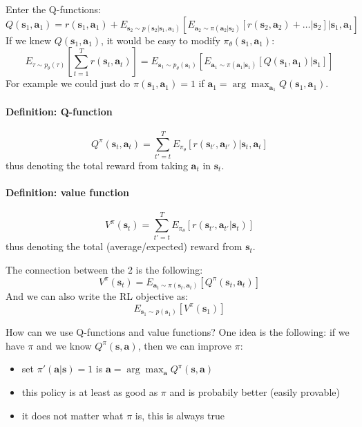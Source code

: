 \documentclass{report}
\newcommand{\argmax}{\arg\!\max}
\begin{document}
Enter the Q-functions:
\begin{equation}
		Q(\bm{s}_1, \bm{a}_1) = 
r(\bm{s}_1, \bm{a}_1) + E_{\bm{s}_2  \sim p(\bm{s}_2 | \bm{s}_1, \bm{a}_1)} 
\left [				E_{\bm{a}_2 \sim \pi(\bm{a}_2|\bm{s}_2)}
				\left[ r(\bm{s}_2, \bm{a}_2) + \dots | \bm{s}_2 \right] | \bm{s}_1, \bm{a}_1
\right]
\end{equation}
If we knew $Q(\bm{s}_1, \bm{a}_1)$, it would be easy to modify $\pi_\theta (\bm{s}_1, \bm{a}_1)$:
\begin{equation}
	E_{\tau \sim p_\theta(\tau)} \left[  \sum_{t=1}^{T} r(\bm{s}_t, \bm{a}_t) \right] 	
	= E_{\bm{s}_1 \sim p_\theta(\bm{s}_1)}
	\left[  E_{\bm{a}_1 \sim \pi(\bm{a}_1|\bm{s}_1)} \left[ Q(\bm{s}_1, \bm{a}_1) |\bm{s}_1 \right]   \right] 
\end{equation}
For example we could just do $\pi(\bm{s}_1, \bm{a}_1) = 1$ 
if $\bm{a}_1 = \argmax_{\bm{a}_1} Q(\bm{s}_1, \bm{a}_1)$.

\paragraph{Definition: Q-function}
\begin{equation}
		Q^\pi (\bm{s}_t, \bm{a}_t) = \sum_{t'=t}^{T} E_{\pi_\theta}
		\left[ r(\bm{s}_{t'}, \bm{a}_{t'} )| \bm{s}_t, \bm{a}_t \right] 
\end{equation}
thus denoting the total reward from taking $\bm{a}_t$ in $\bm{s}_t$.

\paragraph{Definition: value function}
\begin{equation}
		V^\pi (\bm{s}_t) = \sum_{t'=t}^{T} E_{\pi_\theta}
		\left[ r(\bm{s}_{t'}, \bm{a}_{t'} | \bm{s}_t) \right] 
\end{equation}
thus denoting the total (average/expected) reward from $\bm{s}_t$.

The connection between the 2 is the following:
\begin{equation}
		V^\pi (\bm{s}_t) = E_{\bm{a}_t \sim \pi(\bm{s}_t, \bm{a}_t)}
		\left[ Q^\pi(\bm{s}_t, \bm{a}_t) \right] 
\end{equation}
And we can also write the RL objective as:
\begin{equation}
		E_{\bm{s}_1 \sim p(\bm{s}_1)}
		\left[ V^\pi (\bm{s}_1) \right] 
\end{equation}

How can we use Q-functions and value functions?
One idea is the following: if we have $\pi$ and we know $Q^\pi(\bm{s}, \bm{a})$,
then we can improve $\pi$:
\begin{itemize}
		\item set $\pi'(\bm{a}|\bm{s}) = 1$ is $\bm{a} = \argmax_{\bm{a}} Q^\pi(\bm{s}, \bm{a})$
		\item this policy is at least as good as $\pi$ and is probabily better (easily provable)
		\item it does not matter what $\pi$ is, this is always true
\end{itemize}
\end{document}
